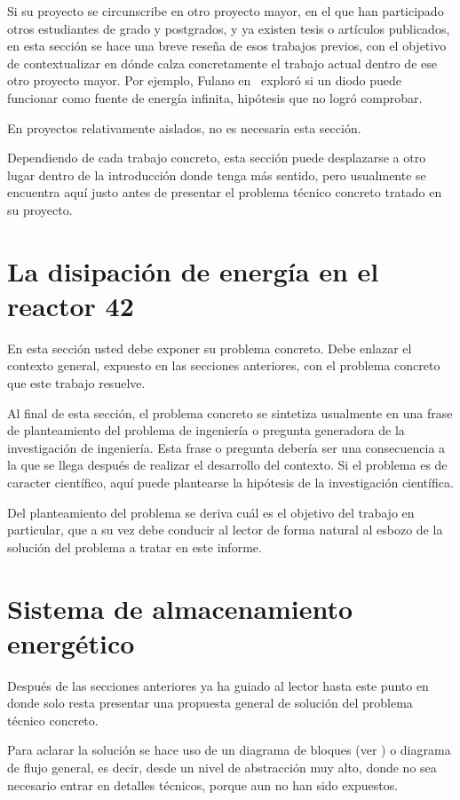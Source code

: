 Si su proyecto se circunscribe en otro proyecto mayor, en el que han
participado otros estudiantes de grado y postgrados, y ya existen
tesis o artículos publicados, en esta sección se hace una breve reseña
de esos trabajos previos, con el objetivo de contextualizar en dónde
calza concretamente el trabajo actual dentro de ese otro proyecto
mayor.  Por ejemplo, Fulano en~\cite{Fulano21} exploró si un diodo
puede funcionar como fuente de energía infinita, hipótesis que no
logró comprobar.

En proyectos relativamente aislados, no es necesaria esta sección.

Dependiendo de cada trabajo concreto, esta sección puede desplazarse a
otro lugar dentro de la introducción donde tenga más sentido, pero
usualmente se encuentra aquí justo antes de presentar el problema
técnico concreto tratado en su proyecto.

\section{La disipación de energía en el reactor 42}

En esta sección usted debe exponer su problema concreto.  Debe enlazar
el contexto general, expuesto en las secciones anteriores, con el
problema concreto que este trabajo resuelve.

Al final de esta sección, el problema concreto se sintetiza usualmente
en una frase de planteamiento del problema de ingeniería o pregunta
generadora de la investigación de ingeniería. Esta frase o pregunta
debería ser una consecuencia a la que se llega después de realizar el
desarrollo del contexto.  Si el problema es de caracter científico,
aquí puede plantearse la hipótesis de la investigación científica.

Del planteamiento del problema se deriva cuál es el objetivo del
trabajo en particular, que a su vez debe conducir al lector de forma
natural al esbozo de la solución del problema a tratar en este
informe.

\section{Sistema de almacenamiento energético}

Después de las secciones anteriores ya ha guiado al lector hasta este
punto en donde solo resta presentar una propuesta general de solución
del problema técnico concreto.

Para aclarar la solución se hace uso de un diagrama de bloques (ver
) o diagrama de flujo general, es decir,
desde un nivel de abstracción muy alto, donde no sea necesario entrar
en detalles técnicos, porque aun no han sido expuestos.


